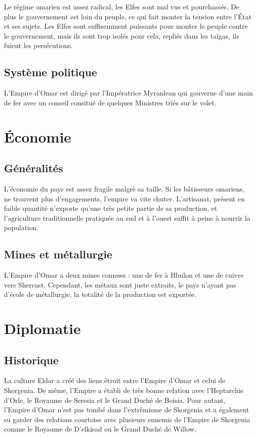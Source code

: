 \documentclass[french, a4paper, 12pt]{article}
\begin{document}
Le régime omarien est assez radical, les Elfes sont mal vus et pourchassés. De plus le gouvernement est loin du peuple, ce qui fait monter la tension entre l'État et ses sujets. Les Elfes sont suffisemment puissants pour monter le peuple contre le gouvernement, mais ils sont trop isolés pour cela, repliés dans les taïgas, ils fuient les persécutions.

\subsection{Système politique}

L'Empire d'Omar est dirigé par l'Impératrice Myranlean qui gouverne d'une main de fer avec un conseil consitué de quelques Ministres triés sur le volet.

\section{Économie}

\subsection{Généralités}

L'économie du pays est assez fragile malgrè sa taille. Si les bâtisseurs omariens, ne trouvent plus d'engagements, l'empire va vite chuter. L'artisanat, présent en faible quantité n'exporte qu'une très petite partie de sa production, et l'agriculture traditionnelle pratiquée au sud et à l'ouest suffit à peine à nourrir la population.

\subsection{Mines et métallurgie}

L'Empire d'Omar a deux mines connues : une de fer à Hluilon et une de cuivre vers Shercast. Cependant, les métaux sont juste extraits, le pays n'ayant pas d'école de métallurgie, la totalité de la production est exportée.

\section{Diplomatie}

\subsection{Historique}

La culture Eldar a créé des liens étroit entre l'Empire d'Omar et celui de Skorgenia. De même, l'Empire a établi de très bonne relation avec l'Heptarchie d'Orle, le Royaume de Seresia et le Grand Duché de Boisia. Pour autant, l'Empire d'Omar n'est pas tombé dans l'extrêmisme de Skorgenia et a également su garder des relations courtoise avec plusieurs ennemis de l'Empire de Skorgenia comme le Royaume de D'elkisad ou le Grand Duché de Willow.
\end{document}
